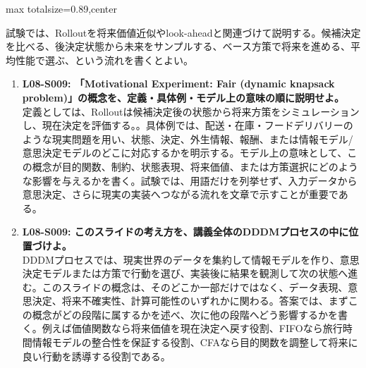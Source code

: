 \begin{minipage}[t]{0.58\textwidth}
\begin{adjustbox}{max totalsize={\textwidth}{0.89\textheight},center}
\begin{minipage}{\textwidth}
試験では、Rolloutを将来価値近似やlook-aheadと関連づけて説明する。候補決定を比べる、後決定状態から未来をサンプルする、ベース方策で将来を進める、平均性能で選ぶ、という流れを書くとよい。\par{}\begin{enumerate}\item \textbf{L08-S009: 「Motivational Experiment: Fair (dynamic knapsack problem)」の概念を、定義・具体例・モデル上の意味の順に説明せよ。}\\定義としては、Rolloutは候補決定後の状態から将来方策をシミュレーションし、現在決定を評価する。。具体例では、配送・在庫・フードデリバリーのような現実問題を用い、状態、決定、外生情報、報酬、または情報モデル/意思決定モデルのどこに対応するかを明示する。モデル上の意味として、この概念が目的関数、制約、状態表現、将来価値、または方策選択にどのような影響を与えるかを書く。試験では、用語だけを列挙せず、入力データから意思決定、さらに現実の実装へつながる流れを文章で示すことが重要である。\item \textbf{L08-S009: このスライドの考え方を、講義全体のDDDMプロセスの中に位置づけよ。}\\DDDMプロセスでは、現実世界のデータを集約して情報モデルを作り、意思決定モデルまたは方策で行動を選び、実装後に結果を観測して次の状態へ進む。このスライドの概念は、そのどこか一部だけではなく、データ表現、意思決定、将来不確実性、計算可能性のいずれかに関わる。答案では、まずこの概念がどの段階に属するかを述べ、次に他の段階へどう影響するかを書く。例えば価値関数なら将来価値を現在決定へ戻す役割、FIFOなら旅行時間情報モデルの整合性を保証する役割、CFAなら目的関数を調整して将来に良い行動を誘導する役割である。\end{enumerate}
\end{minipage}
\end{adjustbox}
\end{minipage}


